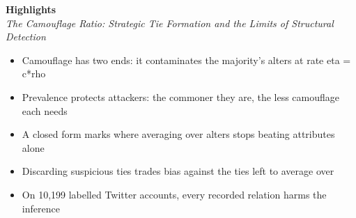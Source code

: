 \documentclass[11pt]{article}
\begin{document}
\begin{center}
{\large\bfseries Highlights}\\[2pt]
{\itshape The Camouflage Ratio: Strategic Tie Formation and the Limits of
Structural Detection}
\end{center}

\vspace{1em}

\begin{itemize}[leftmargin=1.4em,itemsep=0.7em]
  \item Camouflage has two ends: it contaminates the majority's alters at rate
        eta = c*rho
  \item Prevalence protects attackers: the commoner they are, the less camouflage
        each needs
  \item A closed form marks where averaging over alters stops beating attributes
        alone
  \item Discarding suspicious ties trades bias against the ties left to average
        over
  \item On 10,199 labelled Twitter accounts, every recorded relation harms the
        inference
\end{itemize}
\end{document}
